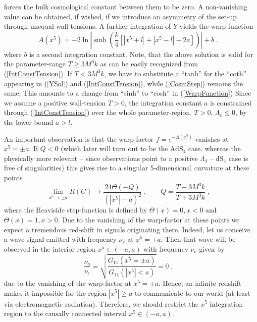 \documentclass[a4paper,12pt]{article}
\begin{document}
forces the bulk cosmological constant between them to be zero. A non-vanishing
value can be obtained, if wished, if we introduce an asymmetry of the set-up
through unequal wall-tensions.
A further integration of $Y$ yields the warp-function
\begin{equation}
  A(x^5)=-2\ln\left|\sinh\left(\frac{k}{4}
                                \left[|x^5+l|+|x^5-l|-2a\right]
                          \right)
              \right| + b \; ,
  \label{WarpFunction}
\end{equation}
where $b$ is a second integration constant.
Note, that the above solution is valid for the parameter-range $T\ge
3M^3 k$ as can be easily recognized from
(\ref{IntConstTension}). If $T < 3M^3 k$, we have to
substitute a ``tanh'' for the ``coth'' appearing in (\ref{YSol}) and
(\ref{IntConstTension}), while (\ref{CosmStep}) remains the same. This amounts
to a change from ``sinh'' to ``cosh'' in (\ref{WarpFunction})
Since we assume a positive wall-tension $T>0$, the integration constant
$a$ is constrained through (\ref{IntConstTension}) over the whole
parameter-region, $T>0$, $\Lambda_e \le 0$, by the lower bound $a>l$. 

An important observation is that the warp-factor $f=e^{-A(x^5)}$
vanishes at $x^5=\pm a$. If $Q<0$ (which later will turn out to be the
$\text{AdS}_4$ case, whereas the physically more relevant -- since
observations point to a positive $\Lambda_4$ -- $\text{dS}_4$ case is
free of singularities) this gives rise to a singular
5-dimensional curvature at these points
\begin{equation}
  \lim_{x^5 \rightarrow \pm a} R(G) 
  \rightarrow
    \frac{24\Theta(-Q)}{(|x^5|-a)^2}   
    \; , \qquad
    Q = \frac{T-3M^3 k}{T+3M^3 k}
    \; ,
\end{equation}
where the Heaviside step-function is defined by $\Theta(x)=0,x<0$ and
$\Theta(x)=1, x>0$. Due to the vanishing of the warp-factor at these
points we expect a tremendous red-shift in signals originating
there. Indeed, let us conceive a wave signal emitted with frequency
$\nu_e$ at $x^5=\pm a$. Then that wave will be observed in the
interior region $x^5 \in (-a,a)$ with frequency $\nu_o$ given by
\begin{equation}
  \frac{\nu_o}{\nu_e} = \sqrt{\frac{G_{11}(x^5=\pm a)}{G_{11}(|x^5|<a)}}
                      = 0 \; ,
\end{equation}
due to the vanishing of the warp-factor at $x^5=\pm a$. Hence, an infinite
redshift makes it impossible for the region $|x^5|\ge a$ to communicate to our
world (at least via electromagnetic radiation). Therefore, we should restrict
the $x^5$ integration region to the causally connected interval $x^5\in
(-a,a)$.
\end{document}
